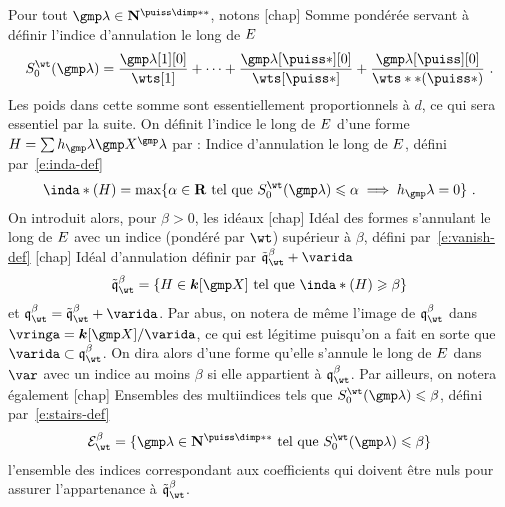 Pour tout \( \imp \in \N^{\puiss\dimp**} \), notons
\nomuse {\wtsum*} [chap] {Somme pondérée servant à définir l'indice
  d'annulation le long de \( E \)}
\begin{equation}
  \wtsum*( \imp )
  =
  \frac {\imp[1][0]} {\wts[1]} + \dots
  + \frac {\imp[\puiss*][0]} {\wts[\puiss*]}
  + \frac {\imp[\puiss][0]} {\wts**(\puiss*)}
  \pmm.
\end{equation}
Les poids dans cette somme sont essentiellement proportionnels à \( d \), ce
qui sera essentiel par la suite.
On définit l'indice le long de \( E \) d'une forme \( H = \sum h_\imp
  \vmp^\imp \) par :
\nomuse {\inda*} {Indice d'annulation le long de \( E \), défini
  par~\eqref{e:inda-def}}
\begin{equation} \label{e:inda-def}
  \inda*(H)
  =
  \max \set{
    \alpha \in \R
    \text{ tel que }
    \wtsum*(\imp) \le \alpha \implies h_\imp = 0
  }
  \pmm.
\end{equation}
On introduit alors, pour \( \beta > 0 \), les idéaux
\nomuse {\vanish[\beta]} [chap] {Idéal des formes s'annulant le long de \(
    E \) avec un indice (pondéré par \( \wt \)) supérieur à \( \beta \),
  défini par~\eqref{e:vanish-def}}
\nomuse {\vanish*[\beta]} [chap] {Idéal d'annulation définir par \(
    \vanish*[\beta] + \varida \)}
\begin{equation} \label{e:vanish-def}
  \vanish*[\beta]
  = \left\{
    H \in \cdn [\vmp]
    \text{ tel que }
    \inda*(H) \ge \beta
  \right\}
\end{equation}
et $\vanish[\beta] = \vanish*[\beta] + \varida$. Par abus, on notera de même
l'image de \( \vanish[\beta] \) dans $\vringa = \cdn [\vmp] / \varida$, ce
qui est légitime puisqu'on a fait en sorte que $\varida \subset
\vanish[\beta]$. On dira alors d'une forme qu'elle s'annule le long de \(
  E \) dans \( \var \) avec un indice au moins \( \beta \) si elle
appartient à \( \vanish[\beta] \).  Par ailleurs, on notera également
\nomuse {\stairs[\beta]} [chap] {Ensembles des multiindices tels que \(
    \wtsum*(\imp) \le \beta \), défini par~\eqref{e:stairs-def}}
\begin{equation} \label{e:stairs-def}
  \stairs[\beta] = \set{
    \imp \in \N^{\puiss\dimp**}
    \text{ tel que }
    \wtsum*(\imp) \le \beta
  }
\end{equation}
l'ensemble des indices correspondant aux coefficients qui doivent être nuls
pour assurer l'appartenance à \( \vanish*[\beta] \).

